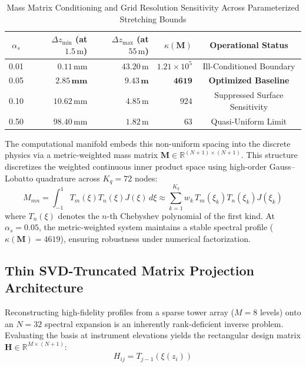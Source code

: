 \documentclass[11pt,a4paper]{article}
\begin{document}
\begin{table}[h]
\centering
\caption{Mass Matrix Conditioning and Grid Resolution Sensitivity Across Parameterized Stretching Bounds}
\label{tab:stretch_sensitivity}
\begin{tabular}{c|rrrc}
\hline
$\alpha_s$ & $\Delta z_{\min}$ (at $1.5\,\text{m}$) & $\Delta z_{\max}$ (at $55\,\text{m}$) & $\kappa(\mathbf{M})$ & Operational Status \\
\hline
0.01 & $0.11\,\text{mm}$ & $43.20\,\text{m}$ & $1.21 \times 10^5$ & Ill-Conditioned Boundary \\
0.05 & $\mathbf{2.85\,\text{mm}}$ & $\mathbf{9.43\,\text{m}}$ & $\mathbf{4619}$ & \textbf{Optimized Baseline} \\
0.10 & $10.62\,\text{mm}$ & $4.85\,\text{m}$ & $924$ & Suppressed Surface Sensitivity \\
0.50 & $98.40\,\text{mm}$ & $1.82\,\text{m}$ & $63$ & Quasi-Uniform Limit \\
\hline
\end{tabular}
\end{table}

The computational manifold embeds this non-uniform spacing into the discrete physics via a metric-weighted mass matrix $\mathbf{M} \in \mathbb{R}^{(N+1) \times (N+1)}$. This structure discretizes the weighted continuous inner product space using high-order Gauss--Lobatto quadrature across $K_q = 72$ nodes:
\begin{equation}
M_{mn} = \int_{-1}^{1} T_m(\xi) T_n(\xi) J(\xi) \, d\xi \approx \sum_{k=1}^{K_q} w_k \, T_m(\xi_k) T_n(\xi_k) J(\xi_k)
\label{eq:mass_matrix_quad}
\end{equation}
where $T_n(\xi)$ denotes the $n$-th Chebyshev polynomial of the first kind. At $\alpha_s = 0.05$, the metric-weighted system maintains a stable spectral profile ($\kappa(\mathbf{M}) = 4619$), ensuring robustness under numerical factorization.

\subsection{Thin SVD-Truncated Matrix Projection Architecture}
\label{sec:methods:svd}

Reconstructing high-fidelity profiles from a sparse tower array ($M = 8$ levels) onto an $N=32$ spectral expansion is an inherently rank-deficient inverse problem. Evaluating the basis at instrument elevations yields the rectangular design matrix $\mathbf{H} \in \mathbb{R}^{M \times (N+1)}$:
\begin{equation}
H_{ij} = T_{j-1}(\xi(z_i))
\label{eq:h_matrix_def}
\end{equation}
\end{document}
